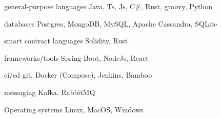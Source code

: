 

\begin{cvskills}

\cvskill
{general-purpose languages} %
{Java, Ts, Js, C\#, Rust, groovy, Python} %

\cvskill
{databases} %
{Postgres, MongoDB, MySQL, Apache Cassandra, SQLite} %

  \cvskill
    {smart contract languages} %
    {Solidity, Rust} %

  \cvskill
    {frameworks/tools} %
    {Spring Boot, NodeJs, React} %

  \cvskill
    {ci/cd} %
    {git, Docker (Compose), Jenkins, Bamboo} %

  \cvskill
    {messaging} %
    {Kafka, RabbitMQ} %

  \cvskill
    {Operating systems} %
    {Linux, MacOS, Windows} %

\end{cvskills}
